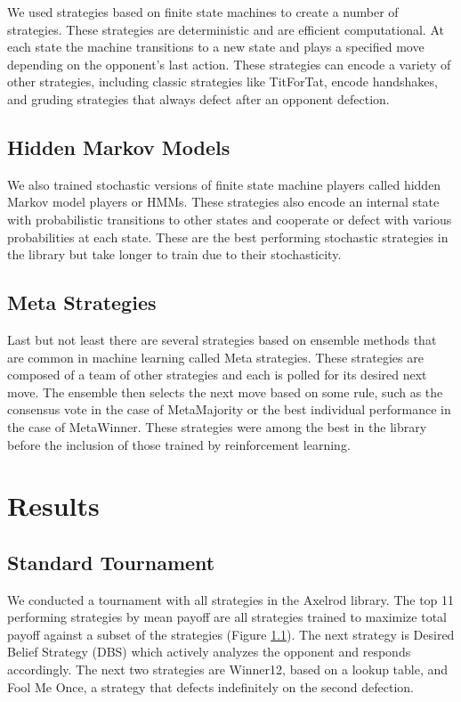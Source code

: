 \documentclass{article}
\begin{document}
We used strategies based on finite state machines to create a number of
strategies. These strategies are deterministic and are efficient computational.
At each state the machine transitions to a new state and plays a specified move
depending on the opponent's last action. These strategies can encode a variety
of other strategies, including classic strategies like TitForTat, encode
handshakes, and gruding strategies that always defect after an opponent
defection.


\subsection{Hidden Markov Models}

We also trained stochastic versions of finite state machine players called
hidden Markov model players or HMMs. These strategies also encode an internal
state with probabilistic transitions to other states and cooperate or defect
with various probabilities at each state. These are the best performing
stochastic strategies in the library but take longer to train due to their
stochasticity.

\subsection{Meta Strategies}

Last but not least there are several strategies based on ensemble methods that
are common in machine learning called Meta strategies. These strategies are
composed of a team of other strategies and each is polled for its desired next
move. The ensemble then selects the next move based on some rule, such as the
consensus vote in the case of MetaMajority or the best individual performance
in the case of MetaWinner. These strategies were among the best in the library
before the inclusion of those trained by reinforcement learning.

\section{Results}

\subsection{Standard Tournament}

We conducted a tournament with all strategies in the Axelrod library. The top
11 performing strategies by mean payoff are all strategies trained to maximize
total payoff against a subset of the strategies (Figure \ref{}). The next strategy is 
Desired Belief Strategy (DBS) which actively analyzes the opponent and responds
accordingly. The next two strategies are Winner12, based on a lookup table, and
Fool Me Once, a strategy that defects indefinitely on the second defection.
\end{document}
